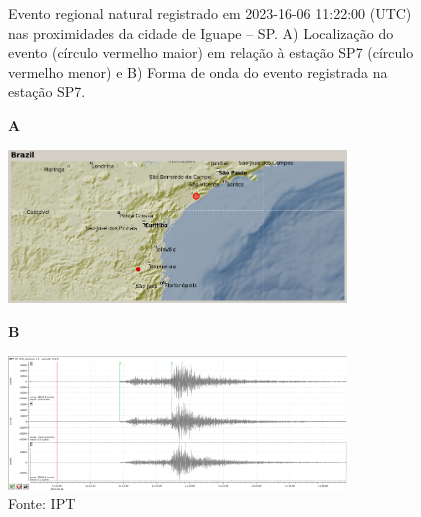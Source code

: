 
\begin{figure}[ht!]
	\captionsetup{justification=justified, singlelinecheck=false, width=1\textwidth}
    \caption{Evento regional natural registrado em 2023-16-06 11:22:00 (UTC) nas proximidades da cidade de Iguape – SP. A) Localização do evento (círculo vermelho maior) em relação à estação SP7 (círculo vermelho menor) e B) Forma de onda do evento registrada na estação SP7.}

    \begin{mdframed}[
        linecolor=black,
        linewidth=1pt,
        roundcorner=10pt,
    ]
    \textbf{A}
    \begin{center}
    \includegraphics[width=0.8\textwidth]{./relatorio/figuras/regiao.png}
    \end{center}
    \end{mdframed}
    \begin{mdframed}[
        linecolor=black,
        linewidth=1pt,
        roundcorner=10pt,
    ]
    \textbf{B}
    \begin{center}
    \includegraphics[width=0.8\textwidth]{./relatorio/figuras/evento_regional.png}
    \end{center}
    \end{mdframed}

    \caption*{Fonte: IPT}
\end{figure}
